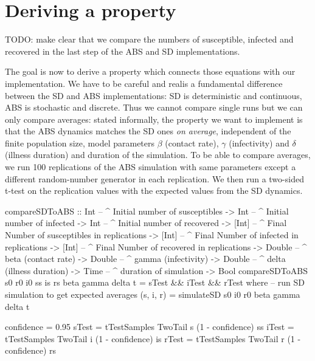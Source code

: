 \section{Deriving a property}

TODO: make clear that we compare the numbers of susceptible, infected and recovered in the last step of the ABS and SD implementations.

The goal is now to derive a property which connects those equations with our implementation. We have to be careful and realis a fundamental difference between the SD and ABS implementations: SD is deterministic and continuous, ABS is stochastic and discrete. Thus we cannot compare single runs but we can only compare averages: stated informally, the property we want to implement is that the ABS dynamics matches the SD ones \textit{on average}, independent of the finite population size, model parameters $\beta$ (contact rate), $\gamma$ (infectivity) and $\delta$ (illness duration) and duration of the simulation. To be able to compare averages, we run 100 replications of the ABS simulation with same parameters except a different random-number generator in each replication. We then run a two-sided t-test on the replication values with the expected values from the SD dynamics.

\begin{HaskellCode}
compareSDToABS :: Int     -- ^ Initial number of susceptibles
               -> Int     -- ^ Initial number of infected
               -> Int     -- ^ Initial number of recovered
               -> [Int]   -- ^ Final Number of susceptibles in replications
               -> [Int]   -- ^ Final Number of infected in replications
               -> [Int]   -- ^ Final Number of recovered in replications
               -> Double  -- ^ beta (contact rate)
               -> Double  -- ^ gamma (infectivity)
               -> Double  -- ^ delta (illness duration)
               -> Time    -- ^ duration of simulation
               -> Bool
compareSDToABS s0 r0 i0
               ss is rs
               beta gamma delta t = sTest && iTest && rTest
  where
    -- run SD simulation to get expected averages
    (s, i, r) = simulateSD s0 i0 r0 beta gamma delta t
    
    confidence = 0.95
    sTest = tTestSamples TwoTail s (1 - confidence) ss
    iTest = tTestSamples TwoTail i (1 - confidence) is
    rTest = tTestSamples TwoTail r (1 - confidence) rs
\end{HaskellCode}

